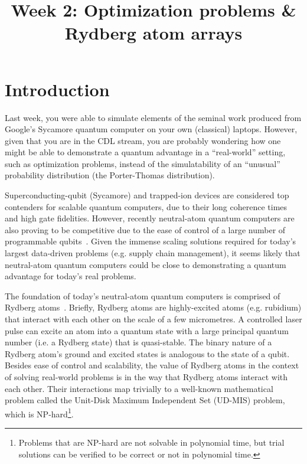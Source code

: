 \documentclass[12pt]{article}
\title{Week 2: Optimization problems \& Rydberg atom arrays}
\author{}
\date{}
\begin{document}
\maketitle

\thispagestyle{empty}

\section*{Introduction}

Last week, you were able to simulate elements of the seminal work produced from Google's Sycamore quantum computer on your own (classical) laptops.
However, given that you are in the CDL stream, you are probably wondering how one might be able to demonstrate a quantum advantage in a ``real-world'' setting, such as optimization problems, instead of the simulatability of an ``unusual'' probability distribution (the Porter-Thomas distribution).

Superconducting-qubit (Sycamore) and trapped-ion devices are considered top contenders for scalable quantum computers, due to their long coherence times and
high gate fidelities.  However, recently neutral-atom quantum computers are also proving to be competitive due to the ease of control of a large number of programmable
qubits~\cite{serret_solving_2020,bernien_probing_2017,ebadi_quantum_2020,henriet_quantum_2020,Browaeys2020}.
Given the immense scaling solutions required for today's largest data-driven problems (e.g. supply chain management), it seems 
likely that neutral-atom quantum computers could be close to demonstrating a quantum advantage for today's real problems.

The foundation of today's neutral-atom quantum computers is comprised of Rydberg atoms~\cite{Browaeys2020}.
Briefly, Rydberg atoms are highly-excited atoms (e.g. rubidium) that interact with each other on the scale of a few micrometres.
A controlled laser pulse can excite an atom into a quantum state with a large principal quantum number (i.e. a Rydberg state) that is quasi-stable.
The binary nature of a Rydberg atom's ground and excited states is analogous to the state of a qubit.
Besides ease of control and scalability, the value of Rydberg atoms in the context of solving real-world problems is in the way that Rydberg atoms interact with each other. 
Their interactions map trivially to a well-known mathematical problem called the Unit-Disk Maximum Independent Set (UD-MIS) problem, which is NP-hard\footnote{Problems that are NP-hard are not solvable in polynomial time, but trial solutions can be verified to be correct or not in polynomial time.}.
\end{document}
